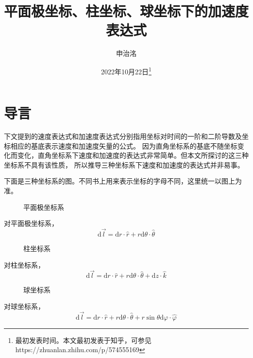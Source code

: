 \documentclass{ctexart}
\title{平面极坐标、柱坐标、球坐标下的加速度表达式}
\author{申治洺}
\date{2022年10月22日\footnote{最初发表时间。本文最初发表于知乎，可参见https://zhuanlan.zhihu.com/p/574555169}}
\begin{document}
    \maketitle  %
    
    \section{导言}\label{sec:1}

    下文提到的速度表达式和加速度表达式分别指用坐标对时间的一阶和二阶导数及坐标相应的基底表示速度和加速度矢量的公式。
    因为直角坐标系的基底不随坐标变化而变化，直角坐标系下速度和加速度的表达式非常简单。但本文所探讨的这三种坐标系不具有该性质，
    所以推导三种坐标系下速度和加速度的表达式并非易事。

    下面是三种坐标系的图。不同书上用来表示坐标的字母不同，这里统一以图上为准。

    \begin{figure}[H]
    \centering
    
    \caption{平面极坐标系}
    \label{fig:polar}
    \end{figure}

    对平面极坐标系，
    \begin{equation*}
        \mathrm{d}\vec{l} = \mathrm{d}r\cdot\hat{r} + r\mathrm{d}\theta\cdot\hat{\theta}
    \end{equation*}

    \begin{figure}[H]
        \centering
        
        \caption{柱坐标系}
        \label{fig:cylindrical}
    \end{figure}
    
    对柱坐标系，
    \begin{equation*}
        \mathrm{d}\vec{l} = \mathrm{d}r\cdot\hat{r} + r\mathrm{d}\theta\cdot\hat{\theta} +
        \mathrm{d}z\cdot\hat{k}
    \end{equation*}

    \begin{figure}[H]
        \centering
        
        \caption{球坐标系}
        \label{fig:spherical}
    \end{figure}
    
    对球坐标系，
    \begin{equation*}
        \mathrm{d}\vec{l} = \mathrm{d}r\cdot\hat{r} + r\mathrm{d}\theta\cdot\hat{\theta} +
        r\sin\theta\mathrm{d}\varphi\cdot\hat{\varphi}
    \end{equation*}
\end{document}
